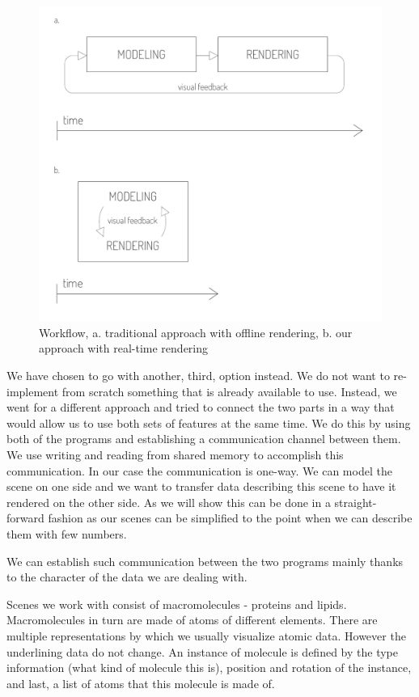 \documentclass[
  digital, %
  table,   %
  nolof,     %
  nolot,     %
]{fithesis3}
\begin{document}
\begin{figure}
  \centering
  \includegraphics[scale=0.7]{images/workflow-before-after.pdf}
  \caption{Workflow, a. traditional approach with offline rendering, b. our approach with real-time rendering}
  \label{fig:workflow}
\end{figure}

We have chosen to go with another, third, option instead. We do not want to re-implement from scratch something that is already available to use. Instead, we went for a different approach and tried to connect the two parts in a way that would allow us to use both sets of features at the same time. We do this by using both of the programs and establishing a communication channel between them. We use writing and reading from shared memory to accomplish this communication. In our case the communication is one-way. We can model the scene on one side and we want to transfer data describing this scene to have it rendered on the other side. As we will show this can be done in a straight-forward fashion as our scenes can be simplified to the point when we can describe them with few numbers.

We can establish such communication between the two programs mainly thanks to the character of the data we are dealing with.

Scenes we work with consist of macromolecules - proteins and lipids. Macromolecules in turn are made of atoms of different elements. There are multiple representations by which we usually visualize atomic data. However the underlining data do not change. An instance of molecule is defined by the type information (what kind of molecule this is), position and rotation of the instance, and last, a list of atoms that this molecule is made of.
\end{document}

